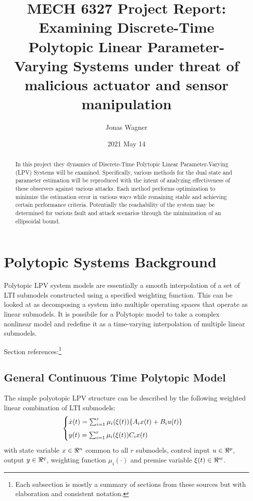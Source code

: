 \documentclass[]{article}
\title{MECH 6327 Project Report:\\
Examining Discrete-Time Polytopic Linear Parameter-Varying Systems under threat of malicious actuator and sensor manipulation}
\author{Jonas Wagner}
\date{2021 May 14}
\begin{document}
\maketitle

\begin{abstract}
	In this project they dynamics of Discrete-Time Polytopic Linear Parameter-Varying (LPV) Systems will be examined. Specifically, various methods for the dual state and parameter estimation will be reproduced with the intent of analyzing effectiveness of these observers against various attacks. Each method performs optimization to minimize the estimation error in various ways while remaining stable and achieving certain performance criteria. Potentially the reachability of the system may be determined for various fault and attack scenarios through the minimization of an ellipsoidal bound.
\end{abstract}


\newpage
\tableofcontents


\newpage
\section{Polytopic Systems Background}
Polytopic LPV system models are essentially a smooth interpolation of a set of LTI submodels constructed using a specified weighting function. This can be looked at as decomposing a system into multiple operating spaces that operate as linear submodels. It is possibile for a Polytopic model to take a complex nonlinear model and redefine it as a time-varying interpolation of multiple linear submodels.

Section references:\footnote{Each subsection is mostly a summary of sections from these sources but with elaboration and consistent notation.}
\cite{beelen2017joint} \cite{ORJUELA2019295} \cite{orjuela2013nonlinear}\\

\subsection{General Continuous Time Polytopic Model} 
The simple polyotopic LPV structure can be described by the following weighted linear combination of LTI submodels:
\begin{equation}\label{eq:CT_poly_sys_def}
	\begin{cases}
		\dot{x}(t) 	= \sum_{i=1}^r \mu_i(\xi(t))\{A_i x(t) + B_i u(t)\}  \vspace{5pt} \\ 
		y(t)		= \sum_{i=1}^r \mu_i(\xi(t)) C_i x(t)
	\end{cases}
\end{equation}
with state variable $x \in \real^n$ common to all $r$ submodels, control input $u \in \real^p$, output $y \in \real^q$, weighting function $\mu_i(\cdot)$ and premise variable $\xi(t) \in \real^{w}$. 
\end{document}

